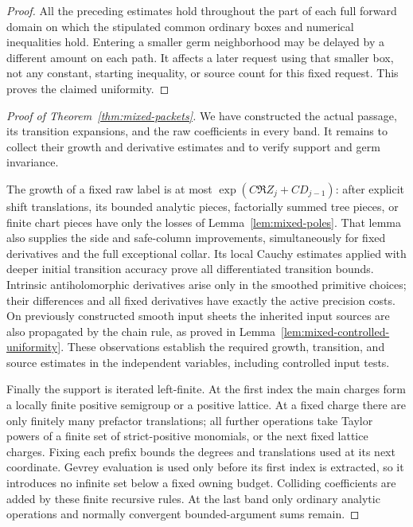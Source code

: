 \begin{proof}
All the preceding estimates hold throughout the part of each full
forward domain on which the stipulated common ordinary boxes and
numerical inequalities hold. Entering a smaller germ neighborhood
may be delayed by a different amount on each path. It affects a
later request using that smaller box, not any constant, starting
inequality, or source count for this fixed request. This proves
the claimed uniformity.
\end{proof}

\begin{proof}[Proof of Theorem~\ref{thm:mixed-packets}]
We have constructed the actual passage, its transition expansions,
and the raw coefficients in every band. It remains to collect their
growth and derivative estimates and to verify support and germ
invariance.

The growth of a fixed raw label is at most
$\exp(C\Re Z_j+CD_{j-1})$: after explicit shift translations,
its bounded analytic pieces, factorially summed tree pieces, or
finite chart pieces have only the losses of
Lemma~\ref{lem:mixed-poles}. That lemma also supplies the side
and safe-column improvements, simultaneously for fixed
derivatives and the full exceptional collar. Its local Cauchy
estimates applied with deeper initial transition accuracy prove
all differentiated transition bounds. Intrinsic antiholomorphic
derivatives arise only in the smoothed primitive choices; their
differences and all fixed derivatives have exactly the active
precision costs. On previously constructed smooth input sheets
the inherited input sources are also propagated by the chain rule,
as proved in Lemma~\ref{lem:mixed-controlled-uniformity}.
These observations establish the required growth, transition, and
source estimates in the independent variables, including controlled
input tests.

Finally the support is iterated left-finite. At the first index
the main charges form a locally finite positive semigroup or
a positive lattice. At a fixed charge there are only finitely
many prefactor translations; all further operations take Taylor
powers of a finite set of strict-positive monomials, or the next
fixed lattice charges. Fixing each prefix bounds the degrees
and translations used at its next coordinate. Gevrey evaluation
is used only before its first index is extracted, so it introduces
no infinite set below a fixed owning budget. Colliding
coefficients are added by these finite recursive rules. At the
last band only ordinary analytic operations and normally
convergent bounded-argument sums remain.


\end{proof}
